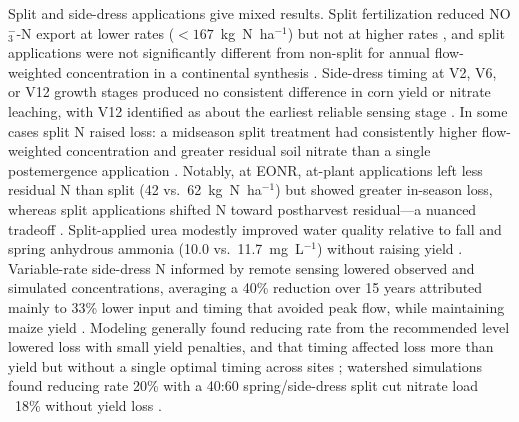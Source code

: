 \documentclass[11pt]{article}
\begin{document}
Split and side-dress applications give mixed results. Split fertilization reduced NO$_3^-$-N export at lower rates ($<167$~kg~N~ha$^{-1}$) but not at higher rates \parencite{Liu2021}, and split applications were not significantly different from non-split for annual flow-weighted concentration in a continental synthesis \parencite{Hertzberger2019}. Side-dress timing at V2, V6, or V12 growth stages produced no consistent difference in corn yield or nitrate leaching, with V12 identified as about the earliest reliable sensing stage \parencite{Jaynes2013}. In some cases split N raised loss: a midseason split treatment had consistently higher flow-weighted concentration and greater residual soil nitrate than a single postemergence application \parencite{Jaynes2006}. Notably, at EONR, at-plant applications left less residual N than split (42 vs.\ 62~kg~N~ha$^{-1}$) but showed greater in-season loss, whereas split applications shifted N toward postharvest residual---a nuanced tradeoff \parencite{Bandura2025}. Split-applied urea modestly improved water quality relative to fall and spring anhydrous ammonia (10.0 vs.\ 11.7~mg~L$^{-1}$) without raising yield \parencite{Waring2022}. Variable-rate side-dress N informed by remote sensing lowered observed and simulated concentrations, averaging a 40\% reduction over 15 years attributed mainly to 33\% lower input and timing that avoided peak flow, while maintaining maize yield \parencite{Wilson2020b}. Modeling generally found reducing rate from the recommended level lowered loss with small yield penalties, and that timing affected loss more than yield but without a single optimal timing across sites \parencite{Jeong2018}; watershed simulations found reducing rate 20\% with a 40:60 spring/side-dress split cut nitrate load ~18\% without yield loss \parencite{Singh2023}.
\end{document}
